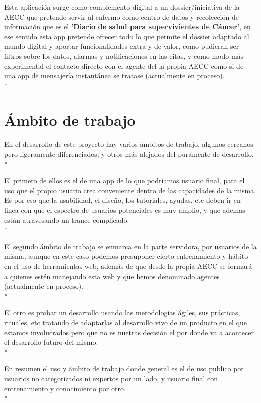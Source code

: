 \documentclass[../pfc.tex]{subfiles}
\begin{document}
Esta aplicación surge como complemento digital a un dossier/iniciativa de la AECC que pretende servir al enfermo como centro de datos y recolección de información que es el \textbf{'Diario de salud para supervivientes de Cáncer'}, en ese sentido esta app pretende ofrecer todo lo que permite el dossier adaptado al mundo digital y aportar funcionalidades extra y de valor, como pudieran ser filtros sobre los datos, alarmas y notificaciones en las citas, y como modo más experimental el contacto directo con el agente del la propia AECC como si de una app de mensajería instantánea se tratase (actualmente en proceso). \\*


\section{Ámbito de trabajo}

En el desarrollo de este proyecto hay varios ámbitos de trabajo, algunos cercanos pero ligeramente diferenciados, y otros más alejados del puramente de desarrollo.\\*

El primero de ellos es el de una app de lo que podríamos usuario final, para el uso que el propio usuario crea conveniente dentro de las capacidades de la misma. Es por eso que la usabilidad, el diseño, los tutoriales, ayudas, etc deben ir en linea con que el espectro de usuarios potenciales es muy amplio, y que ademas están atravesando un trance complicado.\\*

El segundo ámbito de trabajo se enmarca en la parte servidora, por usuarios de la misma, aunque en este caso podemos presuponer cierto entrenamiento y hábito en el uso de herramientas web, además de que desde la propia AECC se formará a quienes estén manejando esta web y que hemos denominado agentes (actualmente en proceso).\\*

El otro es probar un desarrollo usando las metodologías ágiles, sus prácticas, rituales, etc tratando de adaptarlas al desarrollo vivo de un producto en el que estamos involucrados pero que no es nuetras decisión el por donde va a acontecer el desarrollo futuro del mismo.\\*

En resumen el uso y ámbito de trabajo donde general es el de uso publico por usuarios no categorizados ni expertos por un lado, y usuario final con entrenamiento y conocimiento por otro.\\*
\end{document}
